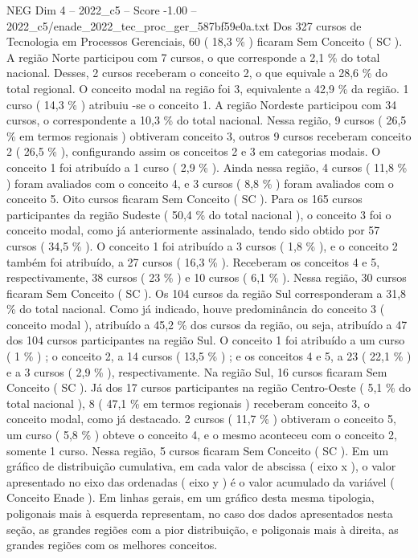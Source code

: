 \begin{textsample}{NEG Dim 4 – 2022\_c5 – Score -1.00 – 2022\_c5/enade\_2022\_tec\_proc\_ger\_587bf59e0a.txt}
Dos 327 cursos de Tecnologia em Processos Gerenciais, 60 ( 18,3 \% ) ficaram Sem Conceito ( SC ).
A região Norte participou com 7 cursos, o que corresponde a 2,1 \% do total nacional.
Desses, 2 cursos receberam o conceito 2, o que equivale a 28,6 \% do total regional.
O conceito modal na região foi 3, equivalente a 42,9 \% da região. 1 curso ( 14,3 \% ) atribuiu -se o conceito 1.
A região Nordeste participou com 34 cursos, o correspondente a 10,3 \% do total nacional.
Nessa região, 9 cursos ( 26,5 \% em termos regionais ) obtiveram conceito 3, outros 9 cursos receberam conceito 2 ( 26,5 \% ), configurando assim os conceitos 2 e 3 em categorias modais.
O conceito 1 foi atribuído a 1 curso ( 2,9 \% ).
Ainda nessa região, 4 cursos ( 11,8 \% ) foram avaliados com o conceito 4, e 3 cursos ( 8,8 \% ) foram avaliados com o conceito 5.
Oito cursos ficaram Sem Conceito ( SC ).
Para os 165 cursos participantes da região Sudeste ( 50,4 \% do total nacional ), o conceito 3 foi o conceito modal, como já anteriormente assinalado, tendo sido obtido por 57 cursos ( 34,5 \% ).
O conceito 1 foi atribuído a 3 cursos ( 1,8 \% ), e o conceito 2 também foi atribuído, a 27 cursos ( 16,3 \% ).
Receberam os conceitos 4 e 5, respectivamente, 38 cursos ( 23 \% ) e 10 cursos ( 6,1 \% ).
Nessa região, 30 cursos ficaram Sem Conceito ( SC ).
Os 104 cursos da região Sul corresponderam a 31,8 \% do total nacional.
Como já indicado, houve predominância do conceito 3 ( conceito modal ), atribuído a 45,2 \% dos cursos da região, ou seja, atribuído a 47 dos 104 cursos participantes na região Sul.
O conceito 1 foi atribuído a um curso ( 1 \% ) ; o conceito 2, a 14 cursos ( 13,5 \% ) ; e os conceitos 4 e 5, a 23 ( 22,1 \% ) e a 3 cursos ( 2,9 \% ), respectivamente.
Na região Sul, 16 cursos ficaram Sem Conceito ( SC ).
Já dos 17 cursos participantes na região Centro-Oeste ( 5,1 \% do total nacional ), 8 ( 47,1 \% em termos regionais ) receberam conceito 3, o conceito modal, como já destacado. 2 cursos ( 11,7 \% ) obtiveram o conceito 5, um curso ( 5,8 \% ) obteve o conceito 4, e o mesmo aconteceu com o conceito 2, somente 1 curso.
Nessa região, 5 cursos ficaram Sem Conceito ( SC ).
Em um gráfico de distribuição cumulativa, em cada valor de abscissa ( eixo x ), o valor apresentado no eixo das ordenadas ( eixo y ) é o valor acumulado da variável ( Conceito Enade ).
Em linhas gerais, em um gráfico desta mesma tipologia, poligonais mais à esquerda representam, no caso dos dados apresentados nesta seção, as grandes regiões com a pior distribuição, e poligonais mais à direita, as grandes regiões com os melhores conceitos.

\end{textsample}
